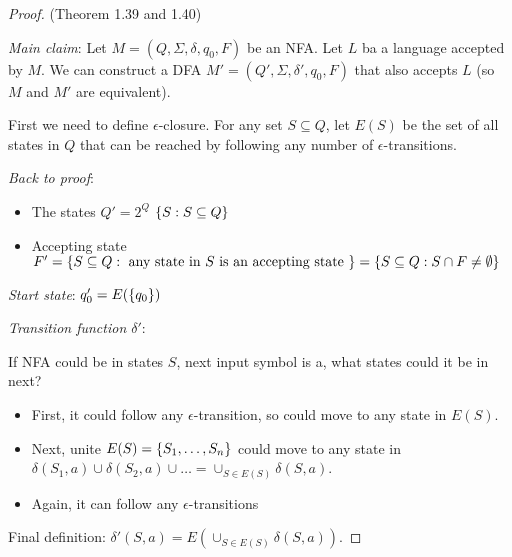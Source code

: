 \begin{proof}
    (Theorem 1.39 and 1.40)

    \emph{Main claim}: Let $M = (Q, \Sigma, \delta, q_0, F)$ be an NFA. Let $L$ ba a language accepted by $M$. We can construct a DFA $M' = (Q', \Sigma, \delta', q_0, F)$ that also accepts $L$ (so $M$ and $M'$ are equivalent).

    First we need to define $\epsilon$-closure. For any set $S \subseteq Q$, let \emph{$E(S)$} be the set of all states in $Q$ that can be reached by following any number of $\epsilon$-transitions.

    \emph{Back to proof}:

    \begin{itemize}
        \item The states $Q' = 2^Q$ $\left \{ S: S \subseteq Q \right \}$
        \item Accepting state $F' = \left \{ S \subseteq Q: \text{ any state in $S$ is an accepting state } \right \} = \left \{ S \subseteq Q: S \cap F \neq \emptyset  \right \}$
    \end{itemize}

    \emph{Start state}: $q_0' = E(\left \{ q_0 \right \})$

    \emph{Transition function $\delta'$}:

    If NFA could be in states $S$, next input symbol is a, what states could it be in next?
    \begin{itemize}
        \item First, it could follow any $\epsilon$-transition, so could move to any state in $E(S)$.
        \item Next, unite $E(S) = \left \{ S_1, \ldots, S_n \right \}$ could move to any state in $\delta(S_1, a) \cup \delta(S_2, a) \cup \ldots = \cup_{S \in E(S)} \delta(S, a)$.
        \item Again, it can follow any $\epsilon$-transitions
    \end{itemize}

    Final definition: $\delta'(S, a) = E(\cup_{S \in E(S)} \delta(S, a))$.
\end{proof}

\backmatter
